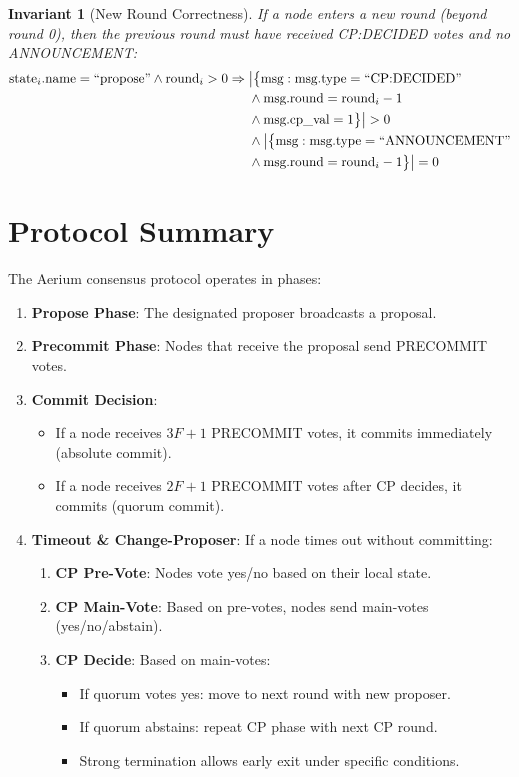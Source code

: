 \documentclass[11pt,a4paper,twoside]{article}
\newtheorem{invariant}{Invariant}[section]
\begin{document}
\begin{invariant}[New Round Correctness]
If a node enters a new round (beyond round 0), then the previous round must have received CP:DECIDED votes and no ANNOUNCEMENT:
\begin{align}
\text{state}_i.\text{name} = \text{``propose''} \land \text{round}_i > 0 \Rightarrow {} & \big|\big\{\text{msg} : \text{msg.type} = \text{``CP:DECIDED''} \notag \\
& \land \text{msg.round} = \text{round}_i - 1 \notag \\
& \land \text{msg.cp\_val} = 1\big\}\big| > 0 \notag \\
& \land \big|\big\{\text{msg} : \text{msg.type} = \text{``ANNOUNCEMENT''} \notag \\
& \land \text{msg.round} = \text{round}_i - 1\big\}\big| = 0
\end{align}
\end{invariant}

\section{Protocol Summary}

The Aerium consensus protocol operates in phases:

\begin{enumerate}[leftmargin=*]
\item \textbf{Propose Phase}: The designated proposer broadcasts a proposal.
\item \textbf{Precommit Phase}: Nodes that receive the proposal send PRECOMMIT votes.
\item \textbf{Commit Decision}:
    \begin{itemize}
    \item If a node receives $3F+1$ PRECOMMIT votes, it commits immediately (absolute commit).
    \item If a node receives $2F+1$ PRECOMMIT votes after CP decides, it commits (quorum commit).
    \end{itemize}
\item \textbf{Timeout \& Change-Proposer}: If a node times out without committing:
    \begin{enumerate}
    \item \textbf{CP Pre-Vote}: Nodes vote yes/no based on their local state.
    \item \textbf{CP Main-Vote}: Based on pre-votes, nodes send main-votes (yes/no/abstain).
    \item \textbf{CP Decide}: Based on main-votes:
        \begin{itemize}
        \item If quorum votes yes: move to next round with new proposer.
        \item If quorum abstains: repeat CP phase with next CP round.
        \item Strong termination allows early exit under specific conditions.
        \end{itemize}
    \end{enumerate}
\end{enumerate}
\end{document}
